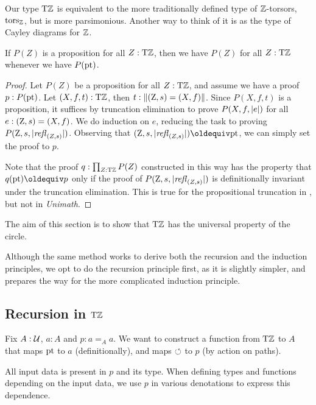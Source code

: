 \documentclass[a4,12pt]{amsart}
\begin{document}
Our type ${\mathrm{T}\mathbb{Z}}$ is equivalent to the more traditionally defined 
type of $\mathbb{Z}$-torsors, $\mathrm{tors}_{\mathbb{Z}}$, but is more parsimonious.
Another way to think of it is as the type of Cayley diagrams for $\mathbb{Z}$.

\begin{lemma}\label{lem:dep-elim-TorZ}
If $P(Z)$ is a proposition for all $Z:{\mathrm{T}\mathbb{Z}}$, then we have $P(Z)$ for all $Z:{\mathrm{T}\mathbb{Z}}$
whenever we have $P({\mathord{\mathrm{pt}}})$.
\end{lemma}

\begin{proof}
Let $P(Z)$ be a proposition for all $Z:{\mathrm{T}\mathbb{Z}}$, and assume we have a proof
$p:P({\mathord{\mathrm{pt}}})$. Let $(X,f,t):{\mathrm{T}\mathbb{Z}}$, then $t :\lVert(\mathrm{Z},s)=(X,f)\rVert$.
Since $P(X,f,t)$ is a proposition, it suffices by truncation elimination
to prove $P(X,f,\lvert e\rvert)$ for all $e:(\mathrm{Z},s)=(X,f)$. 
We do induction on $e$, reducing the task to proving $P(\mathrm{Z},s,\lvert\mathop{{\it refl}_{(Z,s)}}\rvert)$.
Observing that $(\zet,s,\trunc{\refl{(Z,s)}})\jdeq\pt$, we can simply set the proof to $p$.

Note that the proof $q: \prod_{Z:{\mathrm{T}\mathbb{Z}}} P(Z)$ constructed in this way
has the property that $q(\pt)\jdeq p$ only if 
the proof of $P(\mathrm{Z},s,\lvert\mathop{{\it refl}_{(Z,s)}}\rvert)$ is definitionally invariant
under the truncation elimination.
This is true for the propositional truncation in \cite[Ch. 6.9]{hottbook},
but not in \emph{Unimath}.
\end{proof}

The aim of this section is to show that ${\mathrm{T}\mathbb{Z}}$ has the
universal property of the circle.

Although the same method works to derive both the recursion and the induction principles,
we opt to do the recursion principle first, as it is slightly simpler,
and prepares the way for the more complicated induction principle.

\subsection{Recursion in ${\mathrm{T}\mathbb{Z}}$}\label{sec:TorZ-recursion}

Fix $A:\mathcal{U}$, $a:A$ and $p: a=_A a$.
We want to construct a function from ${\mathrm{T}\mathbb{Z}}$ to $A$ 
that maps ${\mathord{\mathrm{pt}}}$ to $a$ (definitionally),
and maps $\circlearrowleft$ to $p$ (by action on paths).

All input data is present in $p$ and its type.
When defining types and functions depending on the input data, 
we use $p$ in various denotations to express this dependence. 
\end{document}
